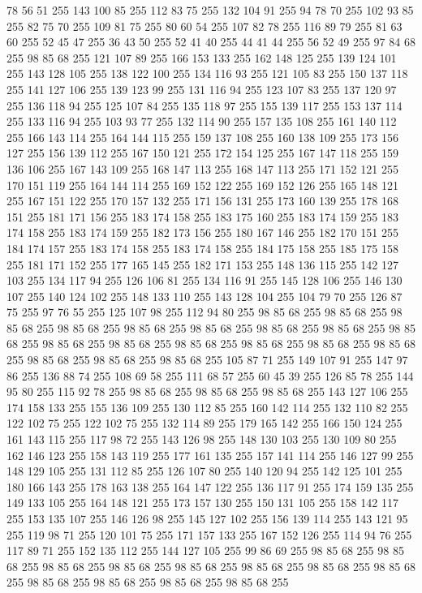 78 56 51 255 143 100 85 255 112 83 75 255 132 104 91 255 94 78 70 255 102 93 85 255 82 75 70 255 109 81 75 255 80 60 54 255 107 82 78 255 116 89 79 255 81 63 60 255 52 45 47 255 36 43 50 255 52 41 40 255 44 41 44 255 56 52 49 255 97 84 68 255 98 85 68 255 121 107 89 255 166 153 133 255 162 148 125 255 139 124 101 255 143 128 105 255 138 122 100 255 134 116 93 255 121 105 83 255 150 137 118 255 141 127 106 255 139 123 99 255 131 116 94 255 123 107 83 255 137 120 97 255 136 118 94 255 125 107 84 255 135 118 97 255 155 139 117 255 153 137 114 255 133 116 94 255 103 93 77 255 132 114 90 255 157 135 108 255 161 140 112 255 166 143 114 255 164 144 115 255 159 137 108 255 160 138 109 255 173 156 127 255 156 139 112 255 167 150 121 255 172 154 125 255 167 147 118 255 159 136 106 255 167 143 109 255 168 147 113 255 168 147 113 255 171 152 121 255 170 151 119 255 164 144 114 255 169 152 122 255 169 152 126 255 165 148 121 255 167 151 122 255 170 157 132 255
171 156 131 255 173 160 139 255 178 168 151 255 181 171 156 255 183 174 158 255 183 175 160 255 183 174 159 255 183 174 158 255 183 174 159 255 182 173 156 255 180 167 146 255 182 170 151 255 184 174 157 255 183 174 158 255 183 174 158 255 184 175 158 255 185 175 158 255 181 171 152 255 177 165 145 255 182 171 153 255 148 136 115 255 142 127 103 255 134 117 94 255 126 106 81 255 134 116 91 255 145 128 106 255 146 130 107 255 140 124 102 255 148 133 110 255 143 128 104 255 104 79 70 255 126 87 75 255 97 76 55 255 125 107 98 255 112 94 80 255 98 85 68 255 98 85 68 255 98 85 68 255 98 85 68 255 98 85 68 255 98 85 68 255 98 85 68 255 98 85 68 255 98 85 68 255 98 85 68 255 98 85 68 255 98 85 68 255 98 85 68 255 98 85 68 255 98 85 68 255 98 85 68 255 98 85 68 255 98 85 68 255 105 87 71 255 149 107 91 255 147 97 86 255 136 88 74 255 108 69 58 255 111 68 57 255 60 45 39 255 126 85 78 255 144 95 80 255 115 92 78 255 98 85 68 255
98 85 68 255 98 85 68 255 143 127 106 255 174 158 133 255 155 136 109 255 130 112 85 255 160 142 114 255 132 110 82 255 122 102 75 255 122 102 75 255 132 114 89 255 179 165 142 255 166 150 124 255 161 143 115 255 117 98 72 255 143 126 98 255 148 130 103 255 130 109 80 255 162 146 123 255 158 143 119 255 177 161 135 255 157 141 114 255 146 127 99 255 148 129 105 255 131 112 85 255 126 107 80 255 140 120 94 255 142 125 101 255 180 166 143 255 178 163 138 255 164 147 122 255 136 117 91 255 174 159 135 255 149 133 105 255 164 148 121 255 173 157 130 255 150 131 105 255 158 142 117 255 153 135 107 255 146 126 98 255 145 127 102 255 156 139 114 255 143 121 95 255 119 98 71 255 120 101 75 255 171 157 133 255 167 152 126 255 114 94 76 255 117 89 71 255 152 135 112 255 144 127 105 255 99 86 69 255 98 85 68 255 98 85 68 255 98 85 68 255 98 85 68 255 98 85 68 255 98 85 68 255 98 85 68 255 98 85 68 255 98 85 68 255 98 85 68 255 98 85 68 255 98 85 68 255
